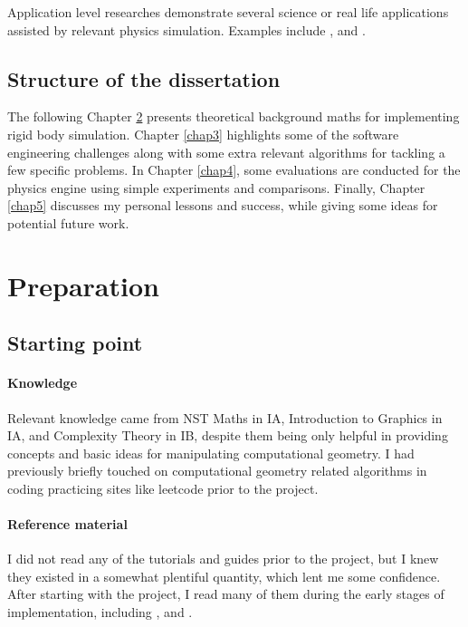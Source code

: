 \documentclass[12pt,a4paper,twoside,openright]{report}
\begin{document}
Application level researches demonstrate several science or real life applications assisted by relevant physics simulation. Examples include \cite{wang2020spring}, \cite{nampoothiri2023slip} and \cite{he2021simulation}.

\section{Structure of the dissertation}

The following Chapter \ref{chap2} presents theoretical background maths for implementing rigid body simulation. Chapter \ref{chap3} highlights some of the software engineering challenges along with some extra relevant algorithms for tackling a few specific problems. In Chapter \ref{chap4}, some evaluations are conducted for the physics engine using simple experiments and comparisons. Finally, Chapter \ref{chap5} discusses my personal lessons and success, while giving some ideas for potential future work.

\chapter{Preparation}\label{chap2}

\section{Starting point}

\subsubsection{Knowledge}

Relevant knowledge came from NST Maths in IA, Introduction to Graphics in IA, and Complexity Theory in IB, despite them being only helpful in providing concepts and basic ideas for manipulating computational geometry. I had previously briefly touched on computational geometry related algorithms in coding practicing sites like leetcode prior to the project.

\subsubsection{Reference material}

I did not read any of the tutorials and guides prior to the project, but I knew they existed in a somewhat plentiful quantity, which lent me some confidence. After starting with the project, I read many of them during the early stages of implementation, including \cite{tutorial1}, \cite{tutorial2} and \cite{tutorialyt}.
\end{document}
